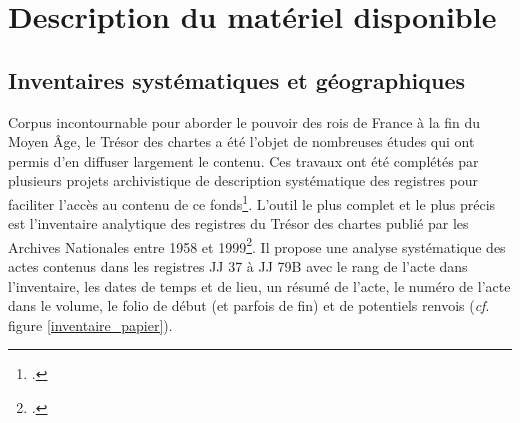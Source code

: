 \documentclass[a4paper,12pt,twoside]{book}
\begin{document}
	\section{Description du matériel disponible}
	
	\subsection{Inventaires systématiques et géographiques}
	
	Corpus incontournable pour aborder le pouvoir des rois de France à la fin du Moyen Âge, le Trésor des chartes a été l'objet de nombreuses études qui ont permis d'en diffuser largement le contenu. Ces travaux ont été complétés par plusieurs projets archivistique de description systématique des registres pour faciliter l'accès au contenu de ce fonds\footcite{stutzmann_recherche_2017}. L'outil le plus complet et le plus précis est l'inventaire analytique des registres du Trésor des chartes publié par les Archives Nationales entre 1958 et 1999\footcite{glenisson_registres_1958}. Il propose une analyse systématique des actes contenus dans les registres JJ 37 à JJ 79B avec le rang de l'acte dans l'inventaire, les dates de temps et de lieu, un résumé de l'acte, le numéro de l'acte dans le volume, le folio de début (et parfois de fin) et de potentiels renvois (\textit{cf}. figure \ref{inventaire_papier}).
	
\end{document}
